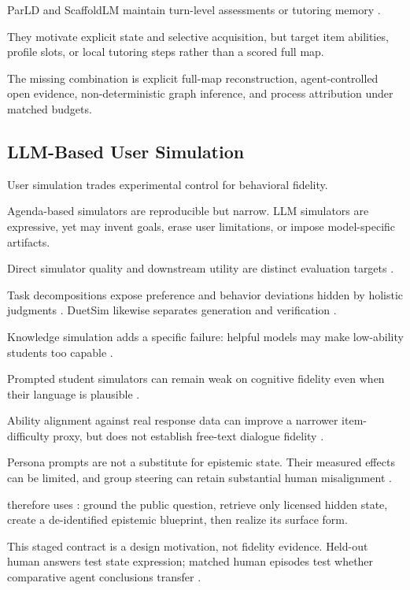 ParLD and ScaffoldLM maintain turn-level assessments or tutoring memory
\citep{yao2026parld,li2026scaffoldlm}.

They motivate explicit state and selective acquisition, but target item abilities, profile slots, or
local tutoring steps rather than a scored full map.

The missing combination is explicit full-map reconstruction, agent-controlled open evidence,
non-deterministic graph inference, and process attribution under matched budgets.

\subsection{LLM-Based User Simulation}

User simulation trades experimental control for behavioral fidelity.

Agenda-based simulators are reproducible but narrow. LLM simulators are expressive, yet may invent
goals, erase user limitations, or impose model-specific artifacts.

Direct simulator quality and downstream utility are distinct evaluation targets
\citep{shi2019usersimulators}.

Task decompositions expose preference and behavior deviations hidden by holistic judgments
\citep{yoon2024generativeusers}. DuetSim likewise separates generation and verification
\citep{luo2024duetsim}.

Knowledge simulation adds a specific failure: helpful models may make low-ability students too capable
\citep{wu2025imperfection}.

Prompted student simulators can remain weak on cognitive fidelity even when their language is plausible
\citep{scarlatos2026simulated}.

Ability alignment against real response data can improve a narrower item-difficulty proxy, but does not
establish free-text dialogue fidelity \citep{scarlatos2025smart}.

Persona prompts are not a substitute for epistemic state. Their measured effects can be limited, and
group steering can retain substantial human misalignment
\citep{hu2024personaeffect,santurkar2023opinions}.

\knowact therefore uses \sagesim: ground the public question, retrieve only licensed hidden state,
create a de-identified epistemic blueprint, then realize its surface form.

This staged contract is a design motivation, not fidelity evidence. Held-out human answers test state
expression; matched human episodes test whether comparative agent conclusions transfer
\citep{dou2025simulatorarena}.

